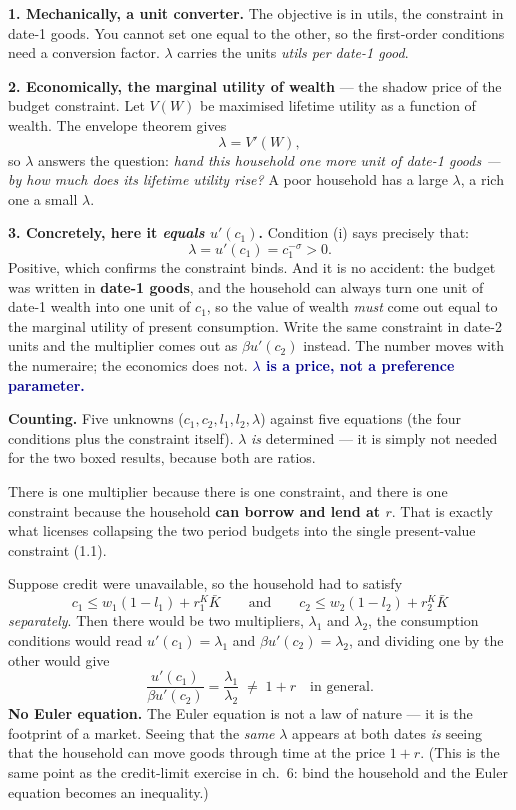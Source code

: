 \documentclass[11pt, a4paper]{article}
\newcommand{\resp}[1]{%
  \ifmmode {\color{darkblue}#1}\else\textcolor{darkblue}{\textbf{#1}}\fi}
\newcommand{\Kb}{\bar K}
\begin{document}
\begin{tcolorbox}[planbox, title={What $\lambda$ is --- three readings of the same number}]
\small
\textbf{1. Mechanically, a unit converter.} The objective is in utils, the constraint in
date-1 goods. You cannot set one equal to the other, so the first-order conditions need a
conversion factor. $\lambda$ carries the units \emph{utils per date-1 good}.

\smallskip
\textbf{2. Economically, the marginal utility of wealth} --- the shadow price of the
budget constraint. Let $V(W)$ be maximised lifetime utility as a function of wealth. The
envelope theorem gives
\[
\lambda=V'(W),
\]
so $\lambda$ answers the question: \emph{hand this household one more unit of date-1
goods --- by how much does its lifetime utility rise?} A poor household has a large
$\lambda$, a rich one a small $\lambda$.

\smallskip
\textbf{3. Concretely, here it \emph{equals} $u'(c_1)$.} Condition (i) says precisely that:
\[
\lambda=u'(c_1)=c_1^{-\sigma}>0 .
\]
Positive, which confirms the constraint binds. And it is no accident: the budget was
written in \textbf{date-1 goods}, and the household can always turn one unit of date-1
wealth into one unit of $c_1$, so the value of wealth \emph{must} come out equal to the
marginal utility of present consumption. Write the same constraint in date-2 units and the
multiplier comes out as $\beta u'(c_2)$ instead. The number moves with the numeraire; the
economics does not. \resp{$\lambda$ is a price, not a preference parameter.}

\smallskip
\textbf{Counting.} Five unknowns ($c_1,c_2,l_1,l_2,\lambda$) against five equations (the
four conditions plus the constraint itself). $\lambda$ \emph{is} determined --- it is
simply not needed for the two boxed results, because both are ratios.
\end{tcolorbox}

\begin{tcolorbox}[trapbox, title={Why there is \emph{one} $\lambda$ and not two --- the credit market is hiding in here}]
\small
There is one multiplier because there is one constraint, and there is one constraint
because the household \textbf{can borrow and lend at $r$}. That is exactly what licenses
collapsing the two period budgets into the single present-value constraint (1.1).

\smallskip
Suppose credit were unavailable, so the household had to satisfy
\[
c_1\le w_1(1-l_1)+r^K_1\Kb
\qquad\text{and}\qquad
c_2\le w_2(1-l_2)+r^K_2\Kb
\]
\emph{separately}. Then there would be two multipliers, $\lambda_1$ and $\lambda_2$, the
consumption conditions would read $u'(c_1)=\lambda_1$ and $\beta u'(c_2)=\lambda_2$, and
dividing one by the other would give
\[
\frac{u'(c_1)}{\beta u'(c_2)}=\frac{\lambda_1}{\lambda_2}\;\neq\;1+r
\quad\text{in general.}
\]
\textbf{No Euler equation.} The Euler equation is not a law of nature --- it is the
footprint of a market. Seeing that the \emph{same} $\lambda$ appears at both dates
\emph{is} seeing that the household can move goods through time at the price $1+r$.
(This is the same point as the credit-limit exercise in ch.\ 6: bind the household and the
Euler equation becomes an inequality.)
\end{tcolorbox}
\end{document}
